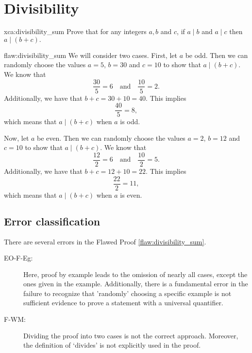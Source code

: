 \section{Divisibility}

\begin{xca}{xca:divisibility_sum}
Prove that for any integers $a,b$ and $c$, if $a \mid b$ and $a \mid c$ then $a \mid (b+c).$
\end{xca}

\begin{flaw}{flaw:divisibility_sum} 
We will consider two cases. 
First, let $a$ be odd. Then we can randomly choose the values $a = 5$, $b = 30$ and $c=10$ to show that $a \mid (b+c)$. We know that $$\frac{30}{5} = 6 \quad\text{and} \quad \frac{10}{5} = 2.$$
Additionally, we have that $b+c = 30 + 10 = 40$. This implies
$$\frac{40}{5} = 8,$$
which means that $a \mid (b+c)$ when $a$ is odd. 

Now, let $a$ be even. Then we can randomly choose the values $a = 2$, $b = 12$ and $c=10$ to show that $a \mid (b+c)$. We know that $$\frac{12}{2} = 6 \quad\text{and} \quad \frac{10}{2} = 5.$$
Additionally, we have that $b+c = 12 + 10 = 22$. This implies
$$\frac{22}{2} = 11,$$
which means that $a \mid (b+c)$ when $a$ is even.
\end{flaw}

\clearpage
\subsection{Error classification}



There are several errors
 in the Flawed Proof \ref{flaw:divisibility_sum}. 

 
 \begin{description}
 	\item[EO-F-Eg:] Here, proof by example leads to the omission of nearly all cases, except the ones given in the example. Additionally, there is a fundamental error in the failure to recognize that 'randomly' choosing a specific example is not sufficient evidence to prove a statement with a universal quantifier.
 	\item[F-WM:] Dividing the proof into two cases is not the correct approach. Moreover, the definition of `divides' is not explicitly used in the proof. 
 \end{description}

